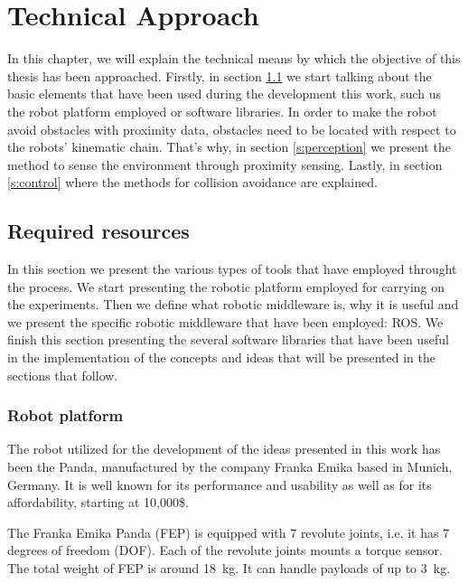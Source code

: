\chapter{Technical Approach}
\label{ch:tec}

In this chapter, we will explain the technical means by which the objective of this thesis has been approached. Firstly, in section \ref{s:pre} we start talking about the basic elements that have been used during the development this work, such us the robot platform employed or software libraries. In order to make the robot avoid obstacles with proximity data, obstacles need to be located with respect to the robots’ kinematic chain. That's why, in section \ref{s:perception} we present the method to sense the environment through proximity sensing. Lastly, in section \ref{s:control} where the methods for collision avoidance are explained.

\section{Required resources}
\label{s:pre}
In this section we present the various types of tools that have employed throught the process. We start presenting the robotic platform employed for carrying on the experiments. Then we define what robotic middleware is, why it is useful and we present the specific robotic middleware that have been employed: ROS. We finish this section presenting the several software libraries that have been useful in the implementation of the concepts and ideas that will be presented in the sections that follow.

\subsection{Robot platform}
\label{ss:panda}

The robot utilized for the development of the ideas presented in this work has been the Panda, manufactured by the company Franka Emika based in Munich, Germany. It is well known for its performance and usability as well as for its affordability, starting at 10,000\$.

The Franka Emika Panda (FEP) is equipped with 7 revolute joints, i.e. it has 7 degrees of freedom (DOF). Each of the revolute joints mounts a torque sensor. The total weight of FEP is around \SI{18}{\kilo\gram}. It can handle payloads of up to \SI{3}{\kilo\gram}.


